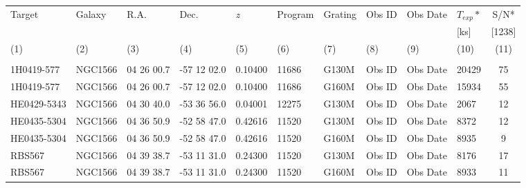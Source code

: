 \documentclass[iop]{emulateapj-rtx4}
\begin{document}
\begin{table}[ht]\footnotesize
\begin{center}
\begin{tabular}{l l l l l l l l l l c}
 \hline \hline
  Target 					& Galaxy				& R.A. 				& Dec. 				& \textit{z}		& Program 	 & Grating 	  & Obs ID 	    & Obs Date		& $T_{exp}*$	& S/N*  \\ 
  	    					& 	       				&	  				& 		  	 		& 		    	& 		  	 & 		  	   & 		     	    & 				& [ks]		& [1238] \\ 
 \scriptsize (1)  				& \scriptsize (2) 		& \scriptsize (3) 		& \scriptsize (4) 		& \scriptsize (5) & \scriptsize (6) & \scriptsize  (7) & \scriptsize (8) & \scriptsize (9) 	& \scriptsize (10) & \scriptsize (11)  \\ \hline \hline
\\
1H0419-577  				&      NGC1566  		&      04  26  00.7  		&	-57  12  02.0  	&   0.10400  	& 11686		&   G130M	&   Obs ID  & Obs Date  & 20429  &      75         \\
1H0419-577  				&      NGC1566  		&      04  26  00.7  		&	-57  12  02.0  	&   0.10400  	& 11686		&   G160M	&   Obs ID  & Obs Date  & 15934  &      55         \\
HE0429-5343  				&      NGC1566  		&      04  30  40.0  		&	-53  36  56.0 	&   0.04001  	& 12275		&   G130M	&   Obs ID  & Obs Date  & 2067  &       12         \\
HE0435-5304  				&      NGC1566  		&      04  36  50.9  		&      -52  58  47.0  	&   0.42616  	& 11520		&   G130M	&   Obs ID  & Obs Date  & 8372  &       12         \\
HE0435-5304  				&      NGC1566  		&      04  36  50.9  		&	-52  58  47.0  	&   0.42616  	& 11520		&   G160M	&   Obs ID  & Obs Date  & 8935  &       9           \\
RBS567  					&      NGC1566  		&      04  39  38.7  		&	-53  11  31.0  	&   0.24300  	& 11520		&   G130M	&   Obs ID  & Obs Date  & 8176  &       17         \\
RBS567  					&      NGC1566  		&      04  39  38.7  		&	-53  11  31.0  	&   0.24300  	& 11520		&   G160M	&   Obs ID  & Obs Date  & 8933  &       11         \\

\end{tabular}
\end{center}
\end{table}
\end{document}
